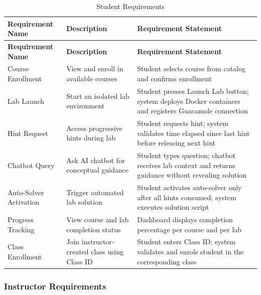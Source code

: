 \documentclass[12pt,a4paper]{report}
\newcommand{\hrow}{}
\newcommand{\hcell}[1]{\textbf{#1}}
\newcommand{\altrow}{}
\begin{document}
\begin{longtable}{|L{3cm}|L{4cm}|L{7cm}|}
\caption{Student Requirements}\label{tab:student-req}\\
\hline
\hrow \hcell{Requirement Name} & \hcell{Description} & \hcell{Requirement Statement} \\
\hline
\endfirsthead
\hline
\hrow \hcell{Requirement Name} & \hcell{Description} & \hcell{Requirement Statement} \\
\hline
\endhead
Course Enrollment & View and enroll in available courses & Student selects course from catalog and confirms enrollment \\\hline
\altrow Lab Launch & Start an isolated lab environment & Student presses Launch Lab button; system deploys Docker containers and registers Guacamole connection \\\hline
Hint Request & Access progressive hints during lab & Student requests hint; system validates time elapsed since last hint before releasing next hint \\\hline
\altrow Chatbot Query & Ask AI chatbot for conceptual guidance & Student types question; chatbot receives lab context and returns guidance without revealing solution \\\hline
Auto-Solver Activation & Trigger automated lab solution & Student activates auto-solver only after all hints consumed; system executes solution script \\\hline
\altrow Progress Tracking & View course and lab completion status & Dashboard displays completion percentage per course and per lab \\\hline
Class Enrollment & Join instructor-created class using Class ID & Student enters Class ID; system validates and enrols student in the corresponding class \\\hline
\end{longtable}

\subsubsection{Instructor Requirements}
\end{document}
